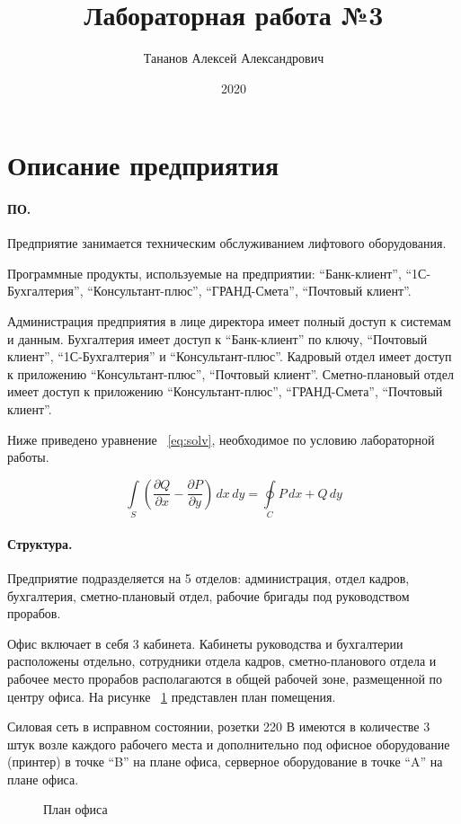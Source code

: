 \documentclass{article}
\title{Лабораторная работа №3}
\author{Тананов Алексей Александрович}
\date{2020}
\begin{document}
\maketitle
\newpage
\section{Описание предприятия}
\paragraph{ПО.}

Предприятие занимается техническим обслуживанием лифтового оборудования.

Программные продукты, используемые на предприятии: “Банк-клиент”, “1С-Бухгалтерия”, “Консультант-плюс”, “ГРАНД-Смета”, “Почтовый клиент”.

Администрация предприятия в лице директора имеет полный доступ к системам и данным. Бухгалтерия имеет доступ к “Банк-клиент” по ключу, “Почтовый клиент”, “1С-Бухгалтерия” и “Консультант-плюс”. Кадровый отдел имеет доступ к приложению “Консультант-плюс”, “Почтовый клиент”. Сметно-плановый отдел имеет доступ к приложению “Консультант-плюс”, “ГРАНД-Смета”, “Почтовый клиент”.  

Ниже приведено уравнение ~\ref{eq:solv}, необходимое по условию лабораторной работы.

\begin{equation}\label{eq:solv}
\int \limits_S \left( \frac{\partial Q}{\partial x} - \frac{\partial P}{\partial y} \right)\, dx \, dy =\oint \limits_C P\,dx + Q \, dy
\end{equation}
\newpage
\paragraph{Структура.}

Предприятие подразделяется на 5 отделов: администрация, отдел кадров, бухгалтерия, сметно-плановый отдел, рабочие бригады под руководством прорабов.

Офис включает в себя 3 кабинета. Кабинеты руководства и бухгалтерии расположены отдельно, сотрудники отдела кадров, сметно-планового отдела и рабочее место прорабов располагаются в общей рабочей зоне, размещенной по центру офиса. На рисунке ~\ref{fig:image} представлен план помещения.

Силовая сеть в исправном состоянии, розетки 220 В имеются в количестве 3 штук возле каждого рабочего места и дополнительно под офисное оборудование (принтер) в точке “B” на плане офиса, серверное оборудование в точке “A” на плане офиса.

\begin{figure}[h]
	\caption{План офиса}
	\label{fig:image}
\end{figure}
\newpage
\tableofcontents
\end{document}
